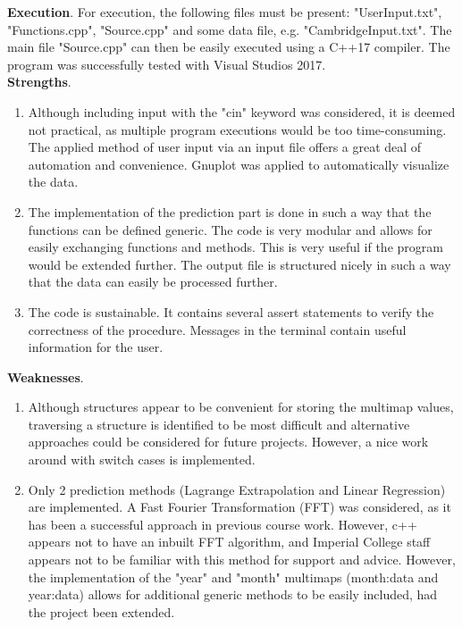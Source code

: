 \documentclass[11pt]{article}
\begin{document}
{\bf Execution}. For execution, the following files must be present: "UserInput.txt", "Functions.cpp", "Source.cpp" and some data file, e.g. "CambridgeInput.txt". The main file "Source.cpp" can then be easily executed using a C++17 compiler. The program was successfully tested with Visual Studios 2017.\\

{\bf Strengths}. 
\begin{enumerate}[label=\alph*.]
\item Although including input with the "cin" keyword was considered, it is deemed not practical, as multiple program executions would be too time-consuming. The applied method of user input via an input file offers a great deal of automation and convenience. Gnuplot was applied to automatically visualize the data.
\item The implementation of the prediction part is done in such a way that the functions can be defined generic. The code is very modular and allows for easily exchanging functions and methods. This is very useful if the program would be extended further. The output file is structured nicely in such a way that the data can easily be processed further. 
\item The code is sustainable. It contains several assert statements to verify the correctness of the procedure. Messages in the terminal contain useful information for the user.
\end{enumerate}

{\bf Weaknesses}. 
\begin{enumerate}[label=\alph*.]
\item Although structures appear to be convenient for storing the multimap values, traversing a structure is identified to be most difficult and alternative approaches could be considered for future projects. However, a nice work around with switch cases is implemented.
\item Only 2 prediction methods (Lagrange Extrapolation and Linear Regression) are implemented. A Fast Fourier Transformation (FFT) was considered, as it has been a successful approach in previous course work. However, c++ appears not to have an inbuilt FFT algorithm, and Imperial College staff appears not to be familiar with this method for support and advice. However, the implementation of the "year" and "month" multimaps (month:data and year:data) allows for additional generic methods to be easily included, had the project been extended.
\end{enumerate}
\end{document}
